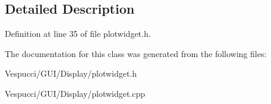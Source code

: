 \subsection{Detailed Description}


Definition at line 35 of file plotwidget.\+h.



The documentation for this class was generated from the following files\+:\begin{DoxyCompactItemize}
\item 
Vespucci/\+G\+U\+I/\+Display/plotwidget.\+h\item 
Vespucci/\+G\+U\+I/\+Display/plotwidget.\+cpp\end{DoxyCompactItemize}

